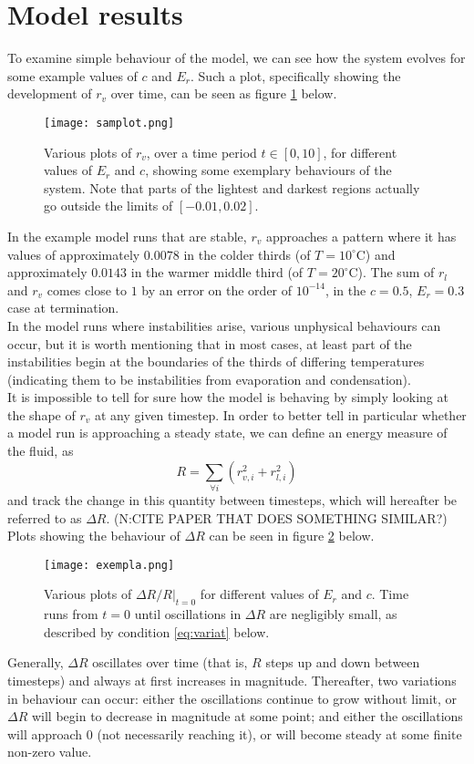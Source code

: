 \documentclass[11pt]{article}
\begin{document}
\section{Model results}
To examine simple behaviour of the model, we can see how the system evolves for some example values of $c$ and $E_r$. Such a plot, specifically showing the development of $r_v$ over time, can be seen as figure \ref{fig:samplot} below.
\begin{figure}[H]
\centering
\texttt{[image: samplot.png]}
\caption{Various plots of $r_v$, over a time period $t\in[0,10]$, for different values of $E_r$ and $c$, showing some exemplary behaviours of the system. Note that parts of the lightest and darkest regions actually go outside the limits of $[-0.01,0.02]$.}
\label{fig:samplot}
\end{figure}
In the example model runs that are stable, $r_v$ approaches a pattern where it has values of approximately $0.0078$ in the colder thirds (of $T=10^{\circ}$C) and approximately $0.0143$ in the warmer middle third (of $T=20^{\circ}$C). The sum of $r_l$ and $r_v$ comes close to $1$ by an error on the order of $10^{-14}$, in the $c=0.5$, $E_r=0.3$ case at termination. \\
In the model runs where instabilities arise, various unphysical behaviours can occur, but it is worth mentioning that in most cases, at least part of the instabilities begin at the boundaries of the thirds of differing temperatures (indicating them to be instabilities from evaporation and condensation). \\
It is impossible to tell for sure how the model is behaving by simply looking at the shape of $r_v$ at any given timestep. In order to better tell in particular whether a model run is approaching a steady state, we can define an energy measure of the fluid, as
\[
R = \sum_{\forall i}\left(r_{v,i}^2+r_{l,i}^2\right)
\]
and track the change in this quantity between timesteps, which will hereafter be referred to as $\Delta R$. (N:CITE PAPER THAT DOES SOMETHING SIMILAR?) Plots showing the behaviour of $\Delta R$ can be seen in figure \ref{fig:exempla} below.
\begin{figure}[H]
\centering
\texttt{[image: exempla.png]}
\caption{Various plots of $\Delta R/R|_{t=0}$ for different values of $E_r$ and $c$. Time runs from $t=0$ until oscillations in $\Delta R$ are negligibly small, as described by condition \ref{eq:variat} below.}
\label{fig:exempla}
\end{figure}
Generally, $\Delta R$ oscillates over time (that is, $R$ steps up and down between timesteps) and always at first increases in magnitude. Thereafter, two variations in behaviour can occur: either the oscillations continue to grow without limit, or $\Delta R$ will begin to decrease in magnitude at some point; and either the oscillations will approach $0$ (not necessarily reaching it), or will become steady at some finite non-zero value. \\
\end{document}
